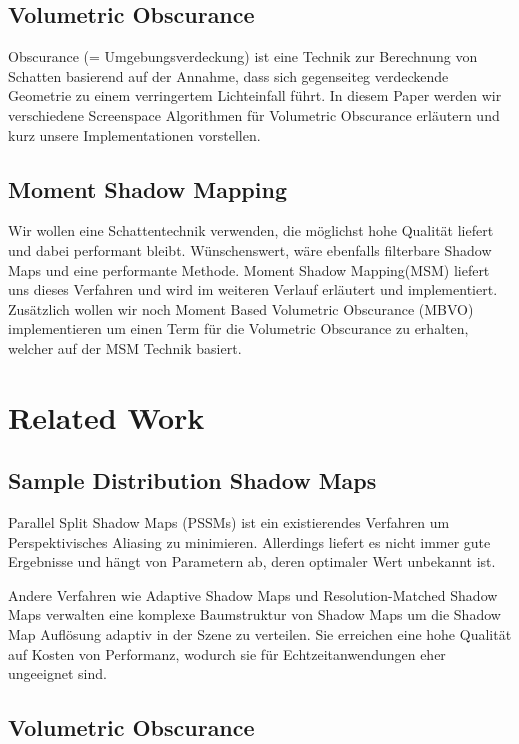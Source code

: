 \documentclass[runningheaders,a4paper]{llncs}
\begin{document}
\subsection{Volumetric Obscurance}
Obscurance (= Umgebungsverdeckung) ist eine Technik zur Berechnung von Schatten basierend auf der Annahme,
dass sich gegenseiteg verdeckende Geometrie zu einem verringertem Lichteinfall führt. In diesem Paper werden
wir verschiedene Screenspace Algorithmen für Volumetric Obscurance erläutern und kurz unsere Implementationen vorstellen.


\subsection{Moment Shadow Mapping}
Wir wollen eine Schattentechnik verwenden, die möglichst hohe Qualität liefert und dabei performant bleibt. Wünschenswert, wäre ebenfalls filterbare Shadow Maps und eine performante Methode. Moment Shadow Mapping(MSM) liefert uns dieses Verfahren und wird im weiteren Verlauf erläutert und implementiert. 
Zusätzlich wollen wir noch Moment Based Volumetric Obscurance (MBVO) implementieren um einen Term für die Volumetric Obscurance zu erhalten, welcher auf der MSM Technik basiert.



\section{Related Work}

\subsection{Sample Distribution Shadow Maps}

Parallel Split Shadow Maps (PSSMs) \cite{pssm} ist ein existierendes Verfahren um Perspektivisches Aliasing zu minimieren.
Allerdings liefert es nicht immer gute Ergebnisse und hängt von Parametern ab, deren optimaler Wert unbekannt ist.

Andere Verfahren wie Adaptive Shadow Maps \cite{asm} und Resolution-Matched Shadow Maps \cite{rmsm} verwalten eine komplexe Baumstruktur von Shadow Maps um die Shadow Map Auflösung adaptiv in der Szene zu verteilen.
Sie erreichen eine hohe Qualität auf Kosten von Performanz, wodurch sie für Echtzeitanwendungen eher ungeeignet sind.


\subsection{Volumetric Obscurance}
\end{document}
